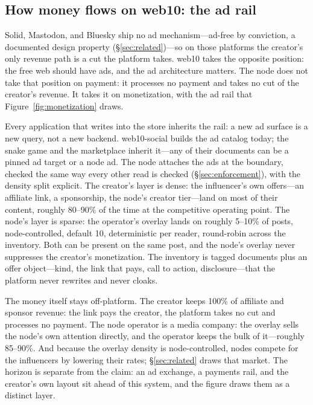 \documentclass[sigconf, nonacm]{acmart}
\begin{document}
\subsection{How money flows on web10: the ad rail}
\label{sec:platform:ads}

Solid, Mastodon, and Bluesky ship no ad mechanism---ad-free by conviction, a
documented design property (\S\ref{sec:related})---so on those platforms the
creator's only revenue path is a cut the platform takes. web10 takes the
opposite position: the free web should have ads, and the ad architecture
matters. The node does not take that position on payment: it processes no
payment and takes no cut of the creator's revenue. It takes it on
monetization, with the ad rail that Figure~\ref{fig:monetization} draws.

Every application that writes into the store inherits the rail: a new ad
surface is a new query, not a new backend. web10-social builds the ad
catalog today; the snake game and the marketplace inherit it---any of their
documents can be a pinned ad target or a node ad. The node attaches the ads
at the boundary, checked the same way every other read is checked
(\S\ref{sec:enforcement}), with the density split explicit. The creator's
layer is dense: the influencer's own offers---an affiliate link, a
sponsorship, the node's creator tier---land on most of their content,
roughly 80--90\% of the time at the competitive operating point. The node's
layer is sparse: the operator's overlay lands on roughly 5--10\% of posts,
node-controlled, default 10, deterministic per reader, round-robin across
the inventory. Both can be present on the same post, and the node's overlay
never suppresses the creator's monetization. The inventory is tagged
documents plus an offer object---kind, the link that pays, call to action,
disclosure---that the platform never rewrites and never cloaks.

The money itself stays off-platform. The creator keeps 100\% of affiliate
and sponsor revenue: the link pays the creator, the platform takes no cut
and processes no payment. The node operator is a media company: the overlay
sells the node's own attention directly, and the operator keeps the bulk of
it---roughly 85--90\%. And because the overlay density is node-controlled,
nodes compete for the influencers by lowering their rates;
\S\ref{sec:related} draws that market. The horizon is separate from the
claim: an ad exchange, a payments rail, and the creator's own layout sit
ahead of this system, and the figure draws them as a distinct layer.
\end{document}
